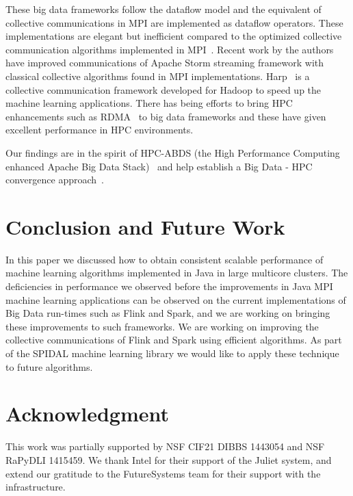 \documentclass[10pt, conference, compsocconf]{IEEEtran}
\begin{document}
These big data frameworks follow the  dataflow model and the equivalent of collective communications in \ac{MPI} are implemented as  dataflow operators. These implementations are elegant but inefficient compared to the optimized collective communication algorithms implemented in MPI~\cite{pjevsivac2007performance, thakur2005optimization}. Recent work by the authors~\cite{kamburugamuve2016towards} have improved communications of Apache Storm streaming framework with classical collective algorithms found in \ac{MPI} implementations. Harp~\cite{zhang2015harp} is a collective communication framework developed for Hadoop to speed up the machine learning applications. There has being efforts to bring HPC enhancements such as RDMA~\cite{lu2013high} to big data frameworks and these have given excellent performance in HPC environments.

Our findings are in the spirit of HPC-ABDS (the High Performance Computing enhanced Apache Big Data Stack)~\cite{kaleidoescope} and help establish a Big Data - HPC convergence approach~\cite{fox1858big}.

\section{Conclusion and Future Work} \label{sec:conclusion}
In this paper we discussed how to obtain consistent scalable performance of machine learning algorithms implemented in Java in large multicore clusters. The deficiencies in performance we observed before the improvements in Java \ac{MPI} machine learning applications can be observed on the current implementations of Big Data run-times such as Flink and Spark, and we are working on bringing these improvements to such frameworks. We are working on improving the collective communications of Flink and Spark using efficient algorithms. As part of the SPIDAL machine learning library we would like to apply these technique to future algorithms.

\section*{Acknowledgment}
This work was partially supported by NSF CIF21 DIBBS 1443054 and NSF RaPyDLI 1415459. We thank Intel  for their support of the Juliet system, and extend our gratitude to the FutureSystems team for their support with the infrastructure. 

\end{document}
